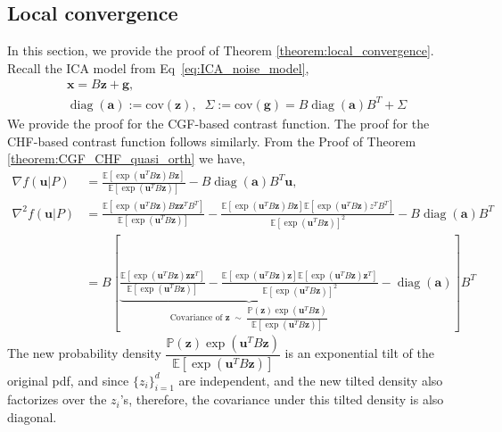 \documentclass[letterpaper]{article}
\newcommand{\bas}[1]{\begin{align*}#1\end{align*}}
\newcommand{\bu}{\pmb{u}}
\newcommand{\bx}{\pmb{x}}
\newcommand{\bg}{\pmb{g}}
\newcommand{\bz}{\pmb{z}}
\newcommand{\bvar}{\pmb{a}}
\newcommand{\cov}{\text{cov}}
\newcommand{\bb}[1]{\left(#1\right)}
\newcommand{\bbb}[1]{\left[#1\right]}
\DeclareMathOperator{\diag}{diag}
\begin{document}
\subsection{Local convergence}
\label{subsection:ica_local_convergence}
In this section, we provide the proof of Theorem \ref{theorem:local_convergence}. Recall the ICA model from Eq~\ref{eq:ICA_noise_model}, 
\bas{
    & \bx = B\bz + \bg, \\
    & \diag\bb{\bvar} := \cov\bb{\bz}, \;\; \Sigma := \cov\bb{\bg} = B\diag\bb{\bvar}B^{T} + \Sigma
}
We provide the proof for the CGF-based contrast function. The proof for the CHF-based contrast function follows similarly.
From the Proof of Theorem \ref{theorem:CGF_CHF_quasi_orth} we have,
\bas{
    \nabla f\bb{\bu|P} &= \frac{\mathbb{E}\bbb{\exp\bb{\bu^{T}B\bz}B\bz}}{\mathbb{E}\bbb{\exp\bb{\bu^{T}B\bz}}} - B\diag\bb{\bvar}B^{T}\bu, \\ 
    \nabla^{2} f\bb{\bu|P} &= \frac{\mathbb{E}\bbb{\exp\bb{\bu^{T}B\bz}B\bz \bz^{T}B^{T}}}{\mathbb{E}\bbb{\exp\bb{\bu^{T}B\bz}}} - \frac{\mathbb{E}\bbb{\exp\bb{\bu^{T}B\bz}B\bz}\mathbb{E}\bbb{\exp\bb{\bu^{T}B\bz}z^{T}B^{T}}}{\mathbb{E}\bbb{\exp\bb{\bu^{T}B\bz}}^{2}} - B\diag\bb{\bvar}B^{T} \\ 
    &= B\bbb{\underbrace{\frac{\mathbb{E}\bbb{\exp\bb{\bu^{T}B\bz}\bz\bz^{T}}}{\mathbb{E}\bbb{\exp\bb{\bu^{T}B\bz}}} - \frac{\mathbb{E}\bbb{\exp\bb{\bu^{T}B\bz}\bz}\mathbb{E}\bbb{\exp\bb{\bu^{T}B\bz}\bz^{T}}}{\mathbb{E}\bbb{\exp\bb{\bu^{T}B\bz}}^{2}}}_{\text{Covariance of } \bz \; \sim \; \dfrac{\mathbb{P}\bb{\bz}\exp\bb{\bu^{T}B\bz}}{\mathbb{E}\bbb{\exp\bb{\bu^{T}B\bz}}}} - \diag\bb{\bvar}}B^{T}
}
The new probability density $\dfrac{\mathbb{P}\bb{\bz}\exp\bb{\bu^{T}B\bz}}{\mathbb{E}\bbb{\exp\bb{\bu^{T}B\bz}}}$ is an exponential tilt of the original pdf, and since $\{z_{i}\}_{i=1}^{d}$ are independent, and the new tilted density also factorizes over the $z_{i}$'s, therefore, the covariance under this tilted density is also diagonal. 
\end{document}
